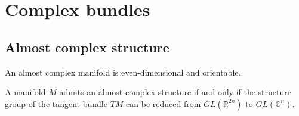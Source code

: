 \chapter{Complex bundles}

\section{Almost complex structure}

	
	\begin{property}
		An almost complex manifold is even-dimensional and orientable.
	\end{property}
	
	\begin{property}
		A manifold $M$ admits an almost complex structure if and only if the structure group of the tangent bundle $TM$ can be reduced from $GL(\mathbb{R}^{2n})$ to $GL(\mathbb{C}^n)$.
	\end{property}
